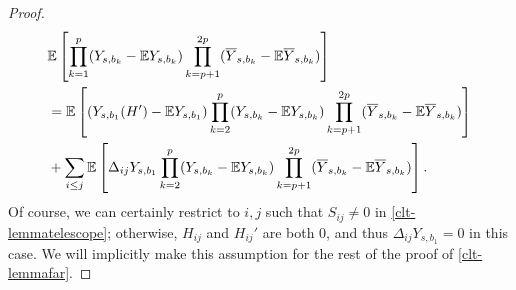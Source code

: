 \begin{proof}
\begin{align}
&\mathbb{E}\left[\prod_{k=1}^{p}(Y_{s,b_{k}}-\mathbb{E} Y_{s,b_{k}})\prod_{k=p+1}^{2p}(\overline{Y}_{s,b_{k}}-\mathbb{E} \overline{Y}_{s,b_{k}})\right]\\
&=\mathbb{E}\left[(Y_{s,b_{1}}(H')-\mathbb{E} Y_{s,b_{1}})\prod_{k=2}^{p}(Y_{s,b_{k}}-\mathbb{E} Y_{s,b_{k}})\prod_{k=p+1}^{2p}(\overline{Y}_{s,b_{k}}-\mathbb{E} \overline{Y}_{s,b_{k}})\right]\label{clt-lemma'}\\
&+\sum_{i\leq j}\mathbb{E}\left[\Delta_{ij}Y_{s,b_{1}}\prod_{k=2}^{p}(Y_{s,b_{k}}-\mathbb{E} Y_{s,b_{k}})\prod_{k=p+1}^{2p}(\overline{Y}_{s,b_{k}}-\mathbb{E} \overline{Y}_{s,b_{k}})\right].\label{clt-lemmatelescope}
\end{align}
%
Of course, we can certainly restrict to $i,j$ such that $S_{ij}\neq0$ in \eqref{clt-lemmatelescope}; otherwise, $H_{ij}$ and $H_{ij}'$ are both $0$, and thus $\Delta_{ij}Y_{s,b_{1}}=0$ in this case. We will implicitly make this assumption for the rest of the proof of \eqref{clt-lemmafar}.


\end{proof}
